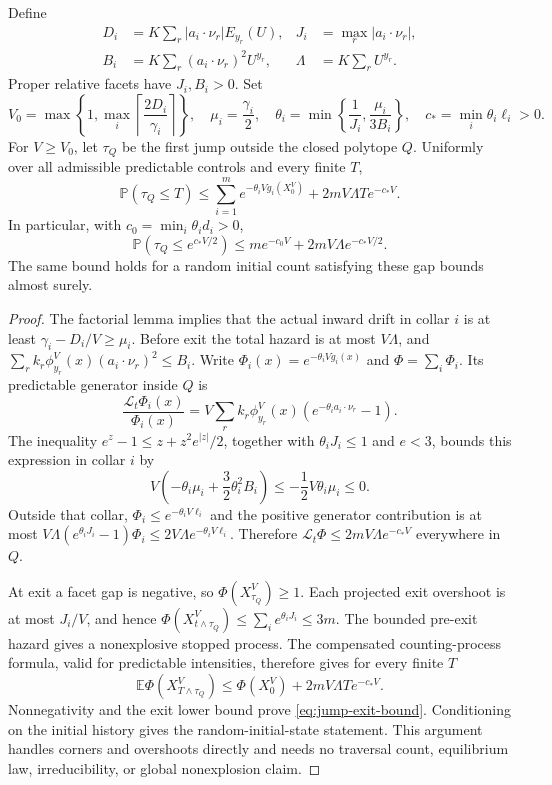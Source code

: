\begin{theorem}
Define
\[
\begin{aligned}
 D_i&=K\sum_r|a_i\cdot\nu_r|E_{y_r}(U),&
 J_i&=\max_r|a_i\cdot\nu_r|,\\
 B_i&=K\sum_r(a_i\cdot\nu_r)^2U^{y_r},&
 \Lambda&=K\sum_r U^{y_r}.
\end{aligned}
\]
Proper relative facets have $J_i,B_i>0$. Set
\[
 V_0=\max\left\{1,\max_i\left\lceil\frac{2D_i}{\gamma_i}
                         \right\rceil\right\},\quad
 \mu_i=\frac{\gamma_i}{2},\quad
 \theta_i=\min\left\{\frac1{J_i},\frac{\mu_i}{3B_i}\right\},
 \quad c_* =\min_i\theta_i\ell_i>0.
\]
For $V\ge V_0$, let $\tau_Q$ be the first jump outside the closed
polytope $Q$. Uniformly over all admissible predictable controls and
every finite $T$,
\begin{equation}
 \mathbb P(\tau_Q\le T)
 \le\sum_{i=1}^m e^{-\theta_i Vg_i(X^V_0)}
                 +2mV\Lambda T e^{-c_*V}.
 \label{eq:jump-exit-bound}
\end{equation}
In particular, with $c_0=\min_i\theta_i d_i>0$,
\[
 \mathbb P(\tau_Q\le e^{c_*V/2})
       \le m e^{-c_0V}+2mV\Lambda e^{-c_*V/2}.
\]
The same bound holds for a random initial count satisfying these gap
bounds almost surely.
\end{theorem}
\begin{proof}
The factorial lemma implies that the actual inward drift in collar $i$
is at least $\gamma_i-D_i/V\ge\mu_i$. Before exit the total hazard is
at most $V\Lambda$, and
$\sum_r k_r\phi^V_{y_r}(x)(a_i\cdot\nu_r)^2\le B_i$.
Write $\Phi_i(x)=e^{-\theta_i Vg_i(x)}$ and
$\Phi=\sum_i\Phi_i$. Its predictable generator inside $Q$ is
\[
 \frac{\mathcal L_t\Phi_i(x)}{\Phi_i(x)}
  =V\sum_r k_r\phi^V_{y_r}(x)
                        (e^{-\theta_i a_i\cdot\nu_r}-1).
\]
The inequality $e^z-1\le z+z^2 e^{|z|}/2$, together with
$\theta_iJ_i\le1$ and $e<3$, bounds this expression in collar $i$ by
\[
 V\left(-\theta_i\mu_i+\frac32\theta_i^2B_i\right)
          \le-\frac12V\theta_i\mu_i\le0.
\]
Outside that collar, $\Phi_i\le e^{-\theta_i V\ell_i}$ and the
positive generator contribution is at most
$V\Lambda(e^{\theta_iJ_i}-1)\Phi_i
 \le2V\Lambda e^{-\theta_i V\ell_i}$.
Therefore $\mathcal L_t\Phi\le2mV\Lambda e^{-c_*V}$ everywhere in $Q$.

At exit a facet gap is negative, so $\Phi(X^V_{\tau_Q})\ge1$.
Each projected exit overshoot is at most $J_i/V$, and hence
$\Phi(X^V_{t\wedge\tau_Q})\le\sum_i e^{\theta_iJ_i}\le3m$.
The bounded pre-exit hazard gives a nonexplosive stopped process.
The compensated counting-process formula, valid for predictable
intensities, therefore gives for every finite $T$
\[
 \mathbb E\Phi(X^V_{T\wedge\tau_Q})
 \le\Phi(X^V_0)+2mV\Lambda T e^{-c_*V}.
\]
Nonnegativity and the exit lower bound prove
\eqref{eq:jump-exit-bound}. Conditioning on the initial history gives
the random-initial-state statement. This argument handles corners and
overshoots directly and needs no traversal count, equilibrium law,
irreducibility, or global nonexplosion claim.
\end{proof}

